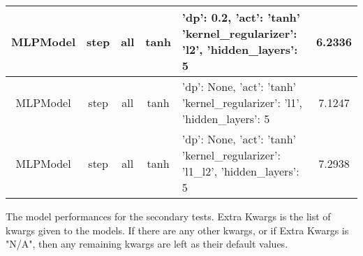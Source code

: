 \documentclass{article}
\newenvironment{changemargin}[2]{%
\begin{list}{}{%
\setlength{\topsep}{0pt}%
\setlength{\leftmargin}{#1}%
\setlength{\rightmargin}{#2}%
\setlength{\listparindent}{\parindent}%
\setlength{\itemindent}{\parindent}%
\setlength{\parsep}{\parskip}%
}%
\item[]}{\end{list}}
\begin{document}
\begin{changemargin}{-4.5cm}{-2cm}
\begin{minipage}{\linewidth}
\begin{tabular}{|c|c|c|c|p{7.25cm}|c| }
MLPModel & step & all & tanh & 'dp': 0.2, 'act': 'tanh' \newline 'kernel\_regularizer': 'l2', 'hidden\_layers': 5 & 6.2336 \\\hline
MLPModel & step & all & tanh & 'dp': None, 'act': 'tanh' \newline 'kernel\_regularizer': 'l1', 'hidden\_layers': 5 & 7.1247 \\\hline
MLPModel & step & all & tanh & 'dp': None, 'act': 'tanh' \newline 'kernel\_regularizer': 'l1\_l2', 'hidden\_layers': 5 & 7.2938 \\\hline
\bottomrule[1.25pt]
\end {tabular}\par
\bigskip
The model performances for the secondary tests. Extra Kwargs is the list of kwargs given to the models. If there are any other kwargs, or if Extra Kwargs is "N/A", then any remaining kwargs are left as their default values.
\end{minipage}
\end{changemargin}
\end{document}
